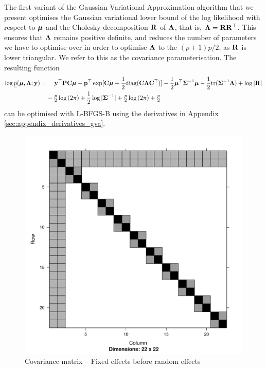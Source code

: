 	The first variant of the Gaussian Variational Approximation algorithm that we present optimises the
	Gaussian variational lower bound of the log likelihood with respect to ${\boldsymbol \mu}$ and the Cholesky decomposition
	${\bf R}$ of ${\boldsymbol \Lambda}$, that is, ${\boldsymbol \Lambda} = {\bf R} {\bf R}^\top$. This ensures that ${\boldsymbol \Lambda}$ remains positive
	definite, and reduces the number of parameters we have to optimise over in order to optimise ${\boldsymbol \Lambda}$
	to the $(p + 1) p / 2$, as ${\bf R}$ is lower triangular.	We refer to this as the covariance
	parameterisation. The resulting function
	\begin{align*}
		\log \underline{p}({\boldsymbol \mu}, {\boldsymbol \Lambda}; {\bf y}) & = \quad {\bf y}^\top{\bf P} {\bf C} {\boldsymbol\mu} - {\bf p}^\top \exp[{\bf C} {\boldsymbol \mu} + \frac{1}{2} \text{diag}({\bf C} {\boldsymbol \Lambda} {\bf C}^\top)] - \frac{1}{2} {\boldsymbol \mu}^\top {\boldsymbol\Sigma}^{-1} {\boldsymbol \mu} - \frac{1}{2} \text{tr}{({\boldsymbol\Sigma}^{-1} {\boldsymbol\Lambda})} + \log{|{\bf R}|} \\
		                                        & \quad - \tfrac{p}{2} \log{(2 \pi)} + \frac{1}{2} \log{|{\boldsymbol\Sigma}^{-1}|} + \tfrac{p}{2} \log{(2 \pi)} + \tfrac{p}{2}                                                                              
	\end{align*}
	can be optimised with L-BFGS-B using the derivatives in Appendix \ref{sec:appendix_derivatives_gva}.
	
	\begin{figure}[p]
		\includegraphics[scale=.25]{mX_mZ_mLambda.pdf}
		\caption{\tiny Covariance matrix -- Fixed effects before random effects}
		\label{fig:covfixedrandom}
	\end{figure}
		
